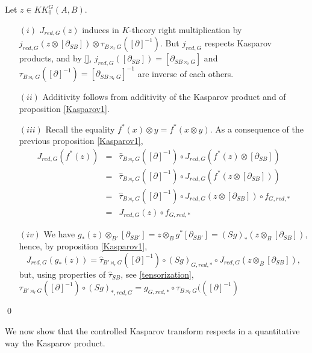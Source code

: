 \begin{dem} Let $z\in KK_0^G(A,B)$.
\begin{itemize}
\item[$(i)$] $J_{red,G}(z)$ induces in $K$-theory right multiplication by $j_{red,G}(z\otimes [\partial_{SB}])\otimes \tau_{B\rtimes_r G}([\partial]^{-1})$. But $j_{red, G}$ respects Kasparov products, and by \ref{}, $j_{red,G}([\partial_{SB}]) = [\partial_{SB\rtimes_r G}]$ and $\tau_{B\rtimes_r G}([\partial]^{-1}) = [\partial_{SB\rtimes_r G }]^{-1}$ are inverse of each others.
\item[$(ii)$] Additivity follows from additivity of the Kasparov product and of proposition \ref{Kasparov1}.
\item[$(iii)$] Recall the equality $f^*(x)\otimes y = f^*(x\otimes y)$. As a consequence of the previous proposition \ref{Kasparov1},
\[\begin{array}{lcl} J_{red,G}(f^*(z)) & = &  \hat\tau_{B\rtimes_r G}([\partial]^{-1}) \circ J_{red,G}(f^*(z)\otimes [\partial_{SB}]) \\
		& = &  \hat\tau_{B\rtimes_r G}([\partial]^{-1}) \circ J_{red,G}(f^*(z\otimes [\partial_{SB}]))\\
		& = &  \hat\tau_{B\rtimes_r G}([\partial]^{-1}) \circ J_{red,G}(z\otimes [\partial_{SB}])\circ f_{G,red,*}\\
		& = & J_{red,G}(z) \circ f_{G,red,*}
\end{array}\]
\item[$(iv)$] We have $g_*(z)\otimes_{B'} [\partial_{SB'}] = z\otimes_B g^{*}[\partial _{SB'}] = (Sg)_{*}(z\otimes_B [\partial _{SB}])$, hence, by proposition \ref{Kasparov1}, 
\[J_{red,G}(g_*(z)) = \hat\tau_{B'\rtimes_r G}([\partial]^{-1}) \circ (Sg)_{G,red,*} \circ J_{red,G}(z\otimes_B [\partial_{SB}]),\]
but, using properties of $\hat\tau_{SB}$, see \ref{tensorization}, $\tau_{B'\rtimes_r G}([\partial]^{-1})\circ (Sg)_{*,red,G} = g_{G,red,*}\circ\tau_{B\rtimes_r G}(([\partial]^{-1})$ 
\end{itemize}
\qed
\end{dem}

We now show that the controlled Kasparov transform respects in a quantitative way the Kasparov product.

